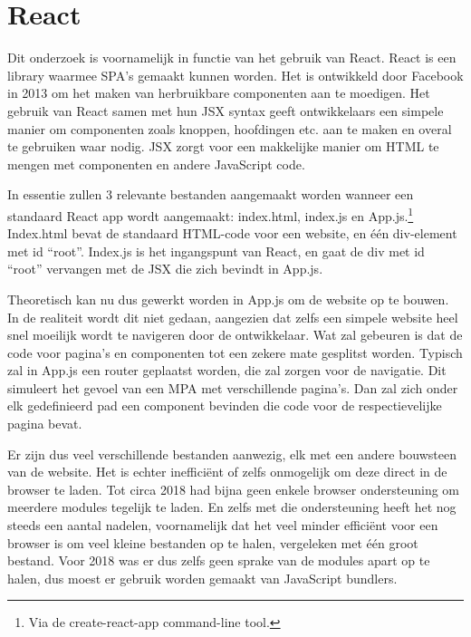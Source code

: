 \section{React}

Dit onderzoek is voornamelijk in functie van het gebruik van React. React is een library waarmee SPA's gemaakt kunnen worden. Het is ontwikkeld door Facebook in 2013 om het maken van herbruikbare componenten aan te moedigen. Het gebruik van React samen met hun JSX syntax geeft ontwikkelaars een simpele manier om componenten zoals knoppen, hoofdingen etc. aan te maken en overal te gebruiken waar nodig. JSX zorgt voor een makkelijke manier om HTML te mengen met componenten en andere JavaScript code.

In essentie zullen 3 relevante bestanden aangemaakt worden wanneer een standaard React app wordt aangemaakt: index.html, index.js en App.js.\footnote{Via de create-react-app command-line tool.} Index.html bevat de standaard HTML-code voor een website, en één div-element met id ``root''. Index.js is het ingangspunt van React, en gaat de div met id ``root'' vervangen met de JSX die zich bevindt in App.js.

Theoretisch kan nu dus gewerkt worden in App.js om de website op te bouwen. In de realiteit wordt dit niet gedaan, aangezien dat zelfs een simpele website heel snel moeilijk wordt te navigeren door de ontwikkelaar. Wat zal gebeuren is dat de code voor pagina's en componenten tot een zekere mate gesplitst worden. Typisch zal in App.js een router geplaatst worden, die zal zorgen voor de navigatie. Dit simuleert het gevoel van een MPA met verschillende pagina's. Dan zal zich onder elk gedefinieerd pad een component bevinden die code voor de respectievelijke pagina bevat.

Er zijn dus veel verschillende bestanden aanwezig, elk met een andere bouwsteen van de website. Het is echter inefficiënt of zelfs onmogelijk om deze direct in de browser te laden. Tot circa 2018 had bijna geen enkele browser ondersteuning om meerdere modules tegelijk te laden. En zelfs met die ondersteuning heeft het nog steeds een aantal nadelen, voornamelijk dat het veel minder efficiënt voor een browser is om veel kleine bestanden op te halen, vergeleken met één groot bestand. Voor 2018 was er dus zelfs geen sprake van de modules apart op te halen, dus moest er gebruik worden gemaakt van JavaScript bundlers.

